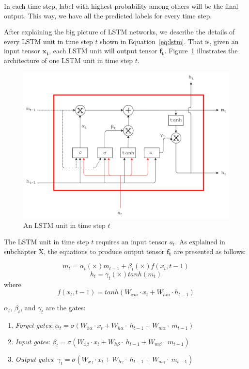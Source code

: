 In each time step, label with highest probability among others will be the final output. This way, we have all the predicted labels for every time step.

After explaining the big picture of LSTM networks, we describe the details of every LSTM unit in time step $t$ shown in Equation~\ref{eq:lstm}. That is, given an input tensor $\mathbf{x_{t}}$, each LSTM unit will output tensor $\mathbf{f_{t}}$. Figure~\ref{fig:lstmunit} illustrates the architecture of one LSTM unit in time step $t$.

\begin{figure}
	\centering
	\includegraphics[width=0.85\linewidth]{images/lstm}
	\caption{An LSTM unit in time step $t$}
	\label{fig:lstmunit}
\end{figure}

The LSTM unit in time step $t$ requires an input tensor $a_{t}$. As explained in subchapter X, the equations to produce output tensor $\mathbf{f_{t}}$ are presented as follows:

\begin{equation}\label{eq:lstmm}
m_{t}=\alpha_{t} (\times) m_{t-1} + \beta_{t} (\times) f(x_{t},{t-1})
\end{equation}
\begin{equation}\label{eq:lstmh}
h_{t}=\gamma_{t} (\times) tanh(m_{t})
\end{equation}
where
\begin{equation}\label{eq:lstmx}
f(x_{t},{t-1})=tanh(W_{xm} \cdot x_{t} + W_{hm} \cdot h_{t-1})
\end{equation}

$ \alpha_t $, $ \beta_t $, and $ \gamma_t $ are the gates:
\begin{enumerate}
	\item \textit{Forget gates}: $ \alpha_{t}=\sigma(W_{x\alpha} \cdot x_{t}+W_{h\alpha}\cdot~h_{t-1}+W_{m\alpha}\cdot~m_{t-1}) $
	\item \textit{Input gates}: $ \beta_{t}=\sigma(W_{x\beta}\cdot x_{t}+W_{h\beta}\cdot~h_{t-1}+W_{m\beta}\cdot~m_{t-1}) $
	\item \textit{Output gates}: $ \gamma_{t}=\sigma(W_{x\gamma}\cdot x_{t}+W_{h\gamma}\cdot~h_{t-1}+W_{m\gamma}\cdot~m_{t-1}) $
\end{enumerate}

